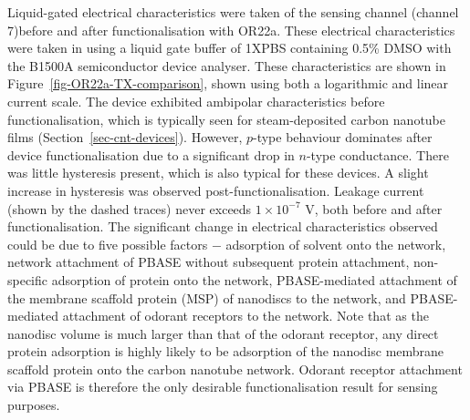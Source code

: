 \documentclass[
  a4paper,
]{scrbook}
\begin{document}
Liquid-gated electrical characteristics were taken of the sensing
channel (channel 7)before and after functionalisation with OR22a. These
electrical characteristics were taken in using a liquid gate buffer of
1XPBS containing 0.5\% DMSO with the B1500A semiconductor device
analyser. These characteristics are shown in
Figure~\ref{fig-OR22a-TX-comparison}, shown using both a logarithmic and
linear current scale. The device exhibited ambipolar characteristics
before functionalisation, which is typically seen for steam-deposited
carbon nanotube films (Section~\ref{sec-cnt-devices}). However,
\(p\)-type behaviour dominates after device functionalisation due to a
significant drop in \(n\)-type conductance. There was little hysteresis
present, which is also typical for these devices. A slight increase in
hysteresis was observed post-functionalisation. Leakage current (shown
by the dashed traces) never exceeds \(1 \times 10^{-7}\) V, both before
and after functionalisation. The significant change in electrical
characteristics observed could be due to five possible factors \(-\)
adsorption of solvent onto the network, network attachment of PBASE
without subsequent protein attachment, non-specific adsorption of
protein onto the network, PBASE-mediated attachment of the membrane
scaffold protein (MSP) of nanodiscs to the network, and PBASE-mediated
attachment of odorant receptors to the network. Note that as the
nanodisc volume is much larger than that of the odorant receptor, any
direct protein adsorption is highly likely to be adsorption of the
nanodisc membrane scaffold protein onto the carbon nanotube network.
Odorant receptor attachment via PBASE is therefore the only desirable
functionalisation result for sensing purposes.
\end{document}
